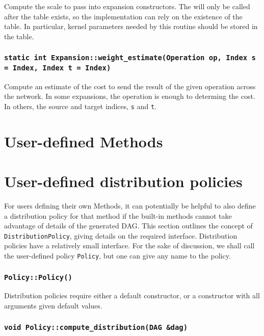 Compute the scale to pass into expansion constructors. The will only be called
after the table exists, so the implementation can rely on the existence of the
table. In particular, kernel parameters needed by this routine should be
stored in the table.

\subsubsection{\texttt{static int Expansion::weight\_estimate(Operation op, Index s = Index{}, Index t = Index{})}}

Compute an estimate of the cost to send the result of the given operation
across the network. In some expansions, the operation is enough to determing
the cost. In others, the source and target indices, \texttt{s} and \texttt{t}.



\section{User-defined Methods}



\section{User-defined distribution policies}

For users defining their own Methods, it can potentially be helpful to also
define a distribution policy for that method if the built-in methods cannot
take advantage of details of the generated DAG. This section outlines the
concept of \texttt{DistributionPolicy}, giving details on the required
interface. Distribution policies have a relatively small interface. For the
sake of discussion, we shall call the user-defined policy \texttt{Policy},
but one can give any name to the policy.

\subsubsection{\texttt{Policy::Policy()}}

Distribution policies require either a default constructor, or a constructor
with all arguments given default values.

\subsubsection{\texttt{void Policy::compute\_distribution(DAG \&dag)}}

